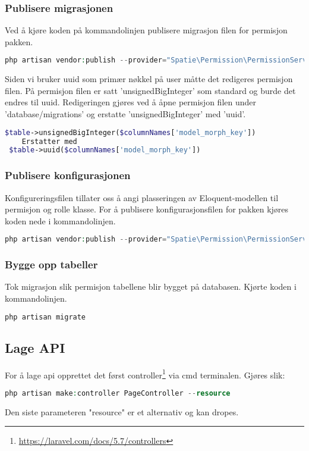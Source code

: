 \subsubsection{Publisere migrasjonen}
Ved å kjøre koden på kommandolinjen publisere migrasjon filen for permisjon pakken.
\begin{lstlisting}[language=PHP]
   php artisan vendor:publish --provider="Spatie\Permission\PermissionServiceProvider" --tag="migrations" 
\end{lstlisting}

Siden vi bruker uuid som primær nøkkel på user måtte det redigeres permisjon filen. På permisjon filen er satt 'unsignedBigInteger' som standard og burde det  endres  til uuid. Redigeringen gjøres ved å åpne permisjon filen  under 'database/migrations' og erstatte 'unsignedBigInteger' med 'uuid'.
\begin{lstlisting}[language=PHP]
  $table->unsignedBigInteger($columnNames['model_morph_key'])
    Erstatter med 
 $table->uuid($columnNames['model_morph_key'])
\end{lstlisting}

\subsubsection{Publisere konfigurasjonen}
Konfigureringsfilen tillater oss å angi plasseringen av Eloquent-modellen til permisjon og rolle klasse.
For å publisere konfigurasjonsfilen for pakken kjøres koden nede i kommandolinjen.

\begin{lstlisting}[language=PHP]
  php artisan vendor:publish --provider="Spatie\Permission\PermissionServiceProvider" --tag="config"
\end{lstlisting}

\subsubsection{Bygge opp tabeller}
Tok migrasjon slik permisjon tabellene blir bygget på databasen.
Kjørte koden i kommandolinjen.
\begin{lstlisting}[language=PHP]
  php artisan migrate
\end{lstlisting}

\subsection{Lage API}
For å lage api opprettet det først controller\footnote{\url{https://laravel.com/docs/5.7/controllers}} via cmd terminalen.
Gjøres slik:
\begin{lstlisting}[language=PHP]
    php artisan make:controller PageController --resource
\end{lstlisting}
Den siste parameteren "resource" er et alternativ og kan dropes.

